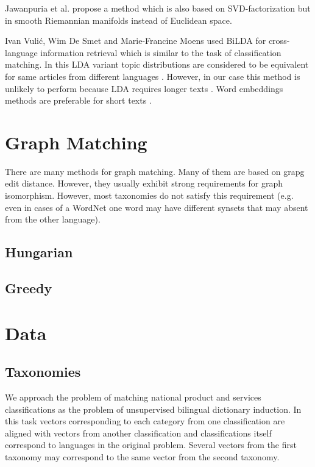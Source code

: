 \documentclass[11pt,a4paper]{article}
\begin{document}
Jawanpuria et al. \cite{jawanpuria} propose a method which is also based on SVD-factorization but in smooth Riemannian manifolds instead of Euclidean space.

Ivan Vulić, Wim De Smet and Marie-Francine Moens  used BiLDA for cross-language information retrieval which is similar to the task of classification matching. In this LDA variant topic distributions are considered to be equivalent for same articles from different languages \cite{bilda}. However, in our case this method is unlikely to perform because LDA requires longer texts \cite{short-lda}. Word embeddings methods are preferable for short texts \cite{maslova-potapov}.
\section{Graph Matching}
There are many methods for graph matching. Many of them are based on grapg edit distance. However, they usually exhibit strong requirements for graph isomorphism. However, most taxonomies do not satisfy this requirement (e.g. even in cases of a WordNet one word may have different synsets that may absent from the other language).
\subsection{Hungarian}
\subsection{Greedy}
\section{Data}
\subsection{Taxonomies}
We approach the problem of matching national product and services classifications as the problem of unsupervised bilingual dictionary induction. In this task vectors corresponding to each category from one classification are aligned with vectors from another classification and classifications itself correspond to languages in the original problem. Several vectors from the first taxonomy may correspond to the same vector from the second taxonomy.
\end{document}
